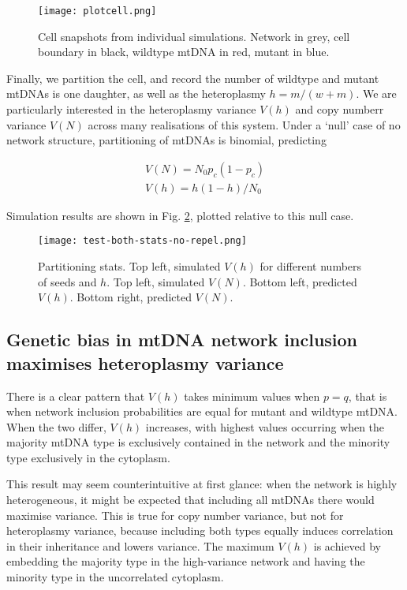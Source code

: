 \documentclass{article}
\begin{document}
\begin{figure}
  \texttt{[image: plotcell.png]}
  \caption{Cell snapshots from individual simulations. Network in grey, cell boundary in black, wildtype mtDNA in red, mutant in blue.}
  \label{fig1}
\end{figure}

Finally, we partition the cell, and record the number of wildtype and mutant mtDNAs is one daughter, as well as the heteroplasmy $h = m/(w+m)$. We are particularly interested in the heteroplasmy variance $V(h)$ and copy numberr variance $V(N)$ across many realisations of this system. Under a `null' case of no network structure, partitioning of mtDNAs is binomial, predicting 

\begin{eqnarray*} 
V(N) = N_0 p_c(1-p_c) \\
V(h) = h(1-h) / N_0
\end{eqnarray*}

Simulation results are shown in Fig. \ref{fig1a}, plotted relative to this null case. 

\begin{figure}
  \texttt{[image: test-both-stats-no-repel.png]}
  \caption{Partitioning stats. Top left, simulated $V(h)$ for different numbers of seeds and $h$. Top left, simulated $V(N)$. Bottom left, predicted $V(h)$. Bottom right, predicted $V(N)$.}
  \label{fig1a}
\end{figure}

\subsection*{Genetic bias in mtDNA network inclusion maximises heteroplasmy variance} 
There is a clear pattern that $V(h)$ takes minimum values when $p=q$, that is when network inclusion probabilities are equal for mutant and wildtype mtDNA. When the two differ, $V(h)$ increases, with highest values occurring when the majority mtDNA type is exclusively contained in the network and the minority type exclusively in the cytoplasm. 

This result may seem counterintuitive at first glance: when the network is highly heterogeneous, it might be expected that including all mtDNAs there would maximise variance. This is true for copy number variance, but not for heteroplasmy variance, because including both types equally induces correlation in their inheritance and lowers variance. The maximum $V(h)$ is achieved by embedding the majority type in the high-variance network and having the minority type in the uncorrelated cytoplasm. 
\end{document}
